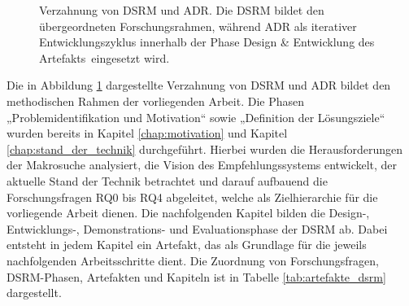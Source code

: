 \begin{figure}[H]
{%
    }

    \caption{Verzahnung von DSRM und ADR. Die DSRM bildet den übergeordneten Forschungsrahmen, während ADR als iterativer Entwicklungszyklus innerhalb der Phase \glqq Design \& Entwicklung des Artefakts\grqq\ eingesetzt wird.}
    \label{fig:dsrm_adr_verzahnung}
\end{figure}

Die in Abbildung \ref{fig:dsrm_adr_verzahnung} dargestellte Verzahnung von DSRM und ADR bildet den methodischen Rahmen der vorliegenden Arbeit. 
Die Phasen „Problemidentifikation und Motivation“ sowie „Definition der Lösungsziele“ wurden bereits in Kapitel \ref{chap:motivation} und Kapitel \ref{chap:stand_der_technik} durchgeführt. 
Hierbei wurden die Herausforderungen der Makrosuche analysiert, die Vision des Empfehlungssystems entwickelt, der aktuelle Stand der Technik betrachtet und darauf aufbauend die Forschungsfragen RQ0 bis RQ4 abgeleitet, welche als Zielhierarchie für die vorliegende Arbeit dienen. 
Die nachfolgenden Kapitel bilden die Design-, Entwicklungs-, Demonstrations- und Evaluationsphase der DSRM ab. Dabei entsteht in jedem Kapitel ein Artefakt, das als Grundlage für die jeweils nachfolgenden Arbeitsschritte dient. 
Die Zuordnung von Forschungsfragen, DSRM-Phasen, Artefakten und Kapiteln ist in Tabelle \ref{tab:artefakte_dsrm} dargestellt.

